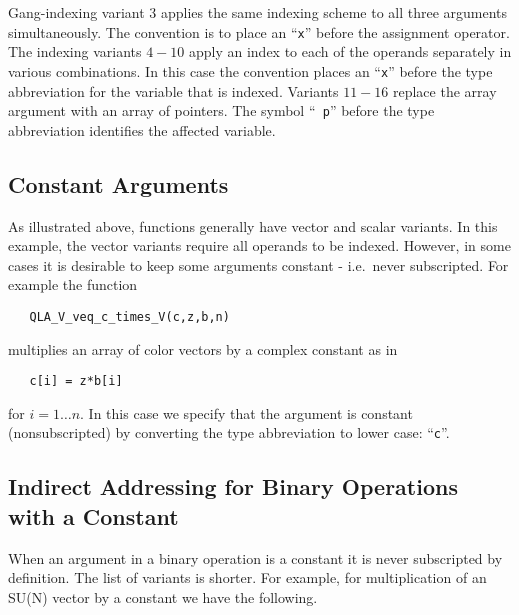 \documentclass{article}
\begin{document}
Gang-indexing variant 3 applies the same indexing scheme to all three
arguments simultaneously.  The convention is to place an ``{\tt x}''
before the assignment operator.  The indexing variants $4-10$ apply an
index to each of the operands separately in various combinations.  In
this case the convention places an ``{\tt x}'' before the type
abbreviation for the variable that is indexed.  Variants $11-16$
replace the array argument with an array of pointers.  The symbol ``{\tt
p}'' before the type abbreviation identifies the affected variable.


\subsection{Constant Arguments}

As illustrated above, functions generally have vector and scalar
variants.  In this example, the vector variants require all operands
to be indexed.  However, in some cases it is desirable to keep some
arguments constant - i.e.\ never subscripted.  For example the
function
%
\begin{verbatim}
   QLA_V_veq_c_times_V(c,z,b,n)
\end{verbatim}
%
multiplies an array of color vectors by a complex constant as in
%
\begin{verbatim}
   c[i] = z*b[i]
\end{verbatim}
%
for $i = 1\ldots{}n$.  In this case we specify that the argument is
constant (nonsubscripted) by converting the type abbreviation to lower
case: ``{\tt c}''.


\subsection{Indirect Addressing for Binary Operations with a Constant}

When an argument in a binary operation is a constant it is never
subscripted by definition.  The list of variants is shorter.  For
example, for multiplication of an SU(N) vector by a constant we have
the following.
\end{document}
